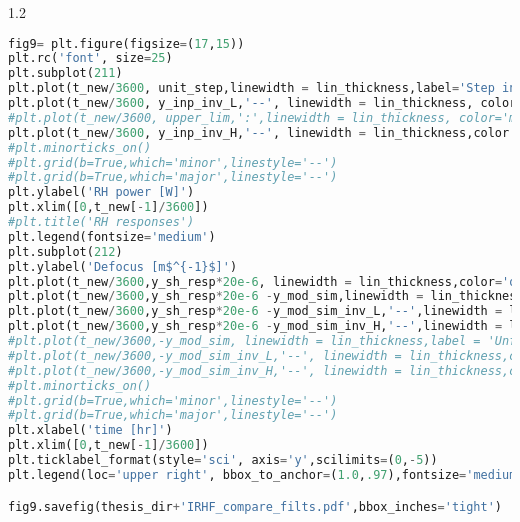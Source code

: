 \begin{spacing}{1.2} \begin{lstlisting}[frame=single,language=Python]
fig9= plt.figure(figsize=(17,15))
plt.rc('font', size=25)
plt.subplot(211)
plt.plot(t_new/3600, unit_step,linewidth = lin_thickness,label='Step input', color= 'purple')
plt.plot(t_new/3600, y_inp_inv_L,'--', linewidth = lin_thickness, color = 'green',label='Filtered input (H$^{-1}$(s)G$_{1}$(s))')
#plt.plot(t_new/3600, upper_lim,':',linewidth = lin_thickness, color='magenta', label='RH upper limit')
plt.plot(t_new/3600, y_inp_inv_H,'--', linewidth = lin_thickness,color = 'red', label='Filtered input (H$^{-1}$(s)G$_{2}$(s))')
#plt.minorticks_on()
#plt.grid(b=True,which='minor',linestyle='--')
#plt.grid(b=True,which='major',linestyle='--')
plt.ylabel('RH power [W]')
plt.xlim([0,t_new[-1]/3600])
#plt.title('RH responses')
plt.legend(fontsize='medium')
plt.subplot(212)
plt.ylabel('Defocus [m$^{-1}$]')
plt.plot(t_new/3600,y_sh_resp*20e-6, linewidth = lin_thickness,color='orange',label ='self heating w/ no RH')
plt.plot(t_new/3600,y_sh_resp*20e-6 -y_mod_sim,linewidth = lin_thickness,label='self heating + step input',color='purple')
plt.plot(t_new/3600,y_sh_resp*20e-6 -y_mod_sim_inv_L,'--',linewidth = lin_thickness,label='self heating + filtered input (H$^{-1}$(s)G$_{1}$(s))',color='green')
plt.plot(t_new/3600,y_sh_resp*20e-6 -y_mod_sim_inv_H,'--',linewidth = lin_thickness,label='self heating + filtered input (H$^{-1}$(s)G$_{2}$(s))',color='red')
#plt.plot(t_new/3600,-y_mod_sim, linewidth = lin_thickness,label = 'Unfiltered step input',color='purple')
#plt.plot(t_new/3600,-y_mod_sim_inv_L,'--', linewidth = lin_thickness,color='green',label ='Filtered input (H$^{-1}$(s)G$_{2}$(s))')
#plt.plot(t_new/3600,-y_mod_sim_inv_H,'--', linewidth = lin_thickness,color='red',label ='Filtered input (H$^{-1}$(s)G$_{1}$(s))')
#plt.minorticks_on()
#plt.grid(b=True,which='minor',linestyle='--')
#plt.grid(b=True,which='major',linestyle='--')
plt.xlabel('time [hr]')
plt.xlim([0,t_new[-1]/3600])
plt.ticklabel_format(style='sci', axis='y',scilimits=(0,-5))
plt.legend(loc='upper right', bbox_to_anchor=(1.0,.97),fontsize='medium')

fig9.savefig(thesis_dir+'IRHF_compare_filts.pdf',bbox_inches='tight')
\end{lstlisting} \end{spacing}


